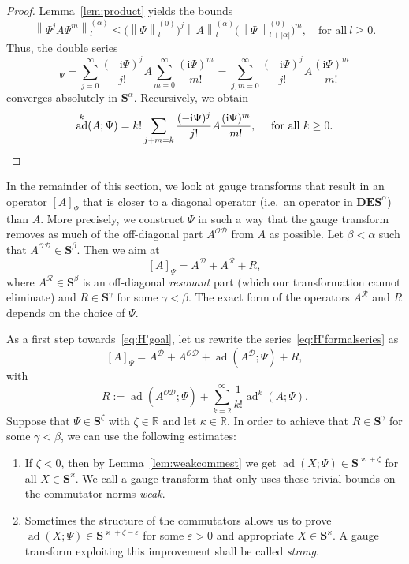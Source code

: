 \documentclass[10pt]{amsart}
\theoremstyle{definition}\newtheorem{defi}[theo]{Definition}\newtheorem{rema}[theo]{Remark}\newtheorem{exam}[theo]{Example}\newtheorem{nota}[theo]{Notation}
\DeclareMathOperator{\ad}{ad}
\newcommand{\rmi}{\mathrm{i}}
\newcommand{\R}{\mathbb R}
\newcommand{\CD}{\mathcal{D}}
\newcommand{\CO}{\mathcal{O}}
\newcommand{\CR}{\mathcal{R}}
\newcommand{\COD}{{\CO\CD}}
\newcommand{\BD}{\mathbf D}
\newcommand{\BE}{\mathbf E}
\newcommand{\BS}{\mathbf S}
\newcommand{\snorm}[3]{\left\| #1\right\|_{#3}^{(#2)}}
\begin{document}
\begin{proof}
Lemma~\ref{lem:product} yields the bounds
\begin{equation}
\snorm{\Psi^jA\Psi^m}{\alpha}{l}\leq \big(\snorm{\Psi}{0}{l}\big)^j\snorm{A}{\alpha}{l}\big(\snorm{\Psi}{0}{l+|\alpha|}\big)^m, \quad \text{for all}\ l\geq 0.
\end{equation}
Thus, the double series
\begin{equation}
[A]_\Psi=\sum_{j= 0}^\infty \frac{(-\rmi \Psi)^j}{j!} A \sum_{m =0}^\infty \frac{(\rmi \Psi)^m}{m!} = \sum_{j,m= 0}^\infty \frac{(-\rmi \Psi)^j}{j!} A \frac{(\rmi \Psi)^m}{m!}
\end{equation}
converges absolutely in $\BS^\alpha$. Recursively, we obtain
\begin{equation}
\ad^k(A;\Psi) = k! \sum_{j + m = k} \frac{(-\rmi \Psi)^j}{j!} A \frac{(\rmi \Psi)^m}{m!}, \quad\text{ for all $k \ge 0$}.\qedhere
\end{equation}
\end{proof}

In the remainder of this section, we look at gauge transforms that result in an operator $[A]_\Psi$ that is closer to a diagonal operator (i.e.~an operator in $\BD\BE\BS^\alpha$) than $A$. More precisely, we construct $\Psi$ in such a way that the gauge transform removes as much of the off-diagonal part $A^{\CO\CD}$ from $A$ as possible. Let $\beta<\alpha$ such that $A^\COD\in\BS^\beta$. Then we aim at
\begin{equation}\label{eq:H'goal}
[A]_\Psi=A^\CD + A^\CR + R,
\end{equation}
where $A^\CR\in\BS^\beta$ is an off-diagonal
\emph{resonant} part (which our transformation cannot eliminate) and $R\in\BS^\gamma$ for some $\gamma <\beta$. The exact form of the operators $A^\CR$ and $R$ depends on the choice of $\Psi$.

As a first step towards~\eqref{eq:H'goal}, let us rewrite the series~\eqref{eq:H'formalseries} as
\begin{equation}\label{eq:firstorder}
[A]_\Psi = A^\CD + A^{\CO\CD} + \ad\left(A^\CD;\Psi\right) + R,
\end{equation}
with
\begin{equation}\label{eq:defRconsecgauge}
R:=\ad(A^{\CO\CD};\Psi)+\sum\limits_{k= 2}^\infty\frac{1}{k!}\ad^k(A;\Psi).
\end{equation}
Suppose that $\Psi \in \BS^\zeta$ with $\zeta \in \R$ and let $\kappa \in \R$. In order to achieve that $R\in\BS^\gamma$ for some $\gamma<\beta$, we can use the following estimates:
\begin{enumerate}
\item If $\zeta <0$, then by Lemma~\ref{lem:weakcommest} we get $\ad(X;\Psi)\in\BS^{\varkappa +\zeta}$ for all $X \in \BS^\varkappa$. We call a gauge transform that only uses these trivial bounds on the commutator norms \emph{weak}.
\item Sometimes the structure of the commutators allows us to prove $\ad(X;\Psi)\in\BS^{\varkappa +\zeta -\varepsilon}$ for some $\varepsilon >0$ and appropriate $X \in \BS^\varkappa$. A gauge transform exploiting this improvement shall be called \emph{strong}.
\end{enumerate}
\end{document}
